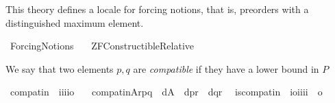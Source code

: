 %
\begin{isabellebody}%
%
%
\isadelimdocument
%
\endisadelimdocument
%
\isatagdocument
%
\isamarkuptrue%
%
\endisatagdocument
{\isafolddocument}%
%
\isadelimdocument
%
\endisadelimdocument
%
\begin{isamarkuptext}%
This theory defines a locale for forcing notions, that is,
 preorders with a distinguished maximum element.%
\end{isamarkuptext}\isamarkuptrue%
%
\isadelimtheory
%
\endisadelimtheory
%
\isatagtheory
{}\isamarkupfalse%
\ Forcing{\isacharunderscore}{\kern0pt}Notions\isanewline
\ \ \ {\isachardoublequoteopen}ZF{\isacharminus}{\kern0pt}Constructible{\isachardot}{\kern0pt}Relative{\isachardoublequoteclose}\isanewline
{}%
\endisatagtheory
{\isafoldtheory}%
%
\isadelimtheory
%
\endisadelimtheory
%
\isadelimdocument
%
\endisadelimdocument
%
\isatagdocument
%
\isamarkuptrue%
%
\endisatagdocument
{\isafolddocument}%
%
\isadelimdocument
%
\endisadelimdocument
%
\begin{isamarkuptext}%
We say that two elements $p,q$ are
  \emph{compatible} if they have a lower bound in $P$%
\end{isamarkuptext}\isamarkuptrue%
\isamarkupfalse%
\ compat{\isacharunderscore}{\kern0pt}in\ {\isacharcolon}{\kern0pt}{\isacharcolon}{\kern0pt}\ {\isachardoublequoteopen}i{\isasymRightarrow}i{\isasymRightarrow}i{\isasymRightarrow}i{\isasymRightarrow}o{\isachardoublequoteclose}\ \isanewline
\ \ {\isachardoublequoteopen}compat{\isacharunderscore}{\kern0pt}in{\isacharparenleft}{\kern0pt}A{\isacharcomma}{\kern0pt}r{\isacharcomma}{\kern0pt}p{\isacharcomma}{\kern0pt}q{\isacharparenright}{\kern0pt}\ {\isasymequiv}\ {\isasymexists}d{\isasymin}A\ {\isachardot}{\kern0pt}\ {\isasymlangle}d{\isacharcomma}{\kern0pt}p{\isasymrangle}{\isasymin}r\ {\isasymand}\ {\isasymlangle}d{\isacharcomma}{\kern0pt}q{\isasymrangle}{\isasymin}r{\isachardoublequoteclose}\isanewline
\isanewline
{}\isamarkupfalse%
\isanewline
\ \ is{\isacharunderscore}{\kern0pt}compat{\isacharunderscore}{\kern0pt}in\ {\isacharcolon}{\kern0pt}{\isacharcolon}{\kern0pt}\ {\isachardoublequoteopen}{\isacharbrackleft}{\kern0pt}i{\isasymRightarrow}o{\isacharcomma}{\kern0pt}i{\isacharcomma}{\kern0pt}i{\isacharcomma}{\kern0pt}i{\isacharcomma}{\kern0pt}i{\isacharbrackright}{\kern0pt}\ {\isasymRightarrow}\ o{\isachardoublequoteclose}\ \isanewline

\end{isabellebody}
